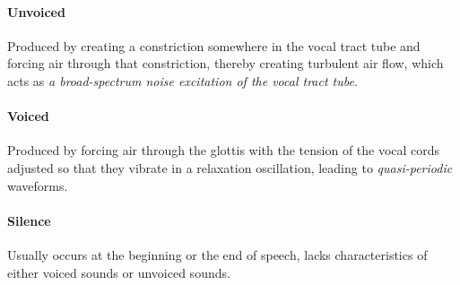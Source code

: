 \paragraph*{Unvoiced} Produced by creating a constriction somewhere in the vocal tract tube and forcing air through that constriction, thereby creating turbulent air flow, which acts as \emph{a broad-spectrum noise excitation of the vocal tract tube}. 
\paragraph*{Voiced} Produced by forcing air through the glottis with the tension of the vocal cords adjusted so that they vibrate in a relaxation oscillation, leading to \emph{quasi-periodic} waveforms.
\paragraph*{Silence} Usually occurs at the beginning or the end of speech, lacks characteristics of either voiced sounds or unvoiced sounds.